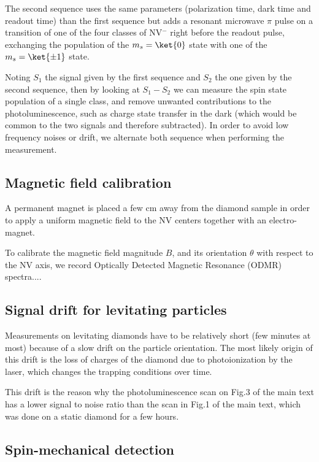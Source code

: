 \documentclass[preprintnumbers,amsmath,amssymb,onecolumn,12pt]{revtex4}
\begin{document}
The second sequence uses the same parameters (polarization time, dark time and readout time) than the first sequence but adds a resonant microwave $\pi$ pulse on a transition of one of the four classes of NV$^-$ right before the readout pulse, exchanging the population of the $m_s=\ket{0}$ state with one of the $m_s=\ket{\pm 1}$ state.

Noting $S_1$ the signal given by the first sequence and $S_2$ the one given by the second sequence, then by looking at $S_1-S_2$ we can measure the spin state population of a single class, and remove unwanted contributions to the photoluminescence, such as charge state transfer in the dark (which would be common to the two signals and therefore subtracted).
In order to avoid low frequency noises or drift, we alternate both sequence when performing the measurement.

\subsection{Magnetic field calibration}

A permanent magnet is placed a few cm away from the diamond sample in order to apply a uniform magnetic field to the NV centers together with an electro-magnet.

To calibrate the magnetic field magnitude $B$, and its orientation $\theta$ with respect to the NV axis, we record Optically Detected Magnetic Resonance (ODMR) spectra.... 

\subsection{Signal drift for levitating particles}

Measurements on levitating diamonds have to be relatively short (few minutes at most) because of a slow drift on the particle orientation. The most likely origin of this drift is the loss of charges of the diamond due to photoionization by the laser, which changes the trapping conditions over time.

This drift is the reason why the photoluminescence scan on Fig.3 of the main text has a lower signal to noise ratio than the scan in Fig.1 of the main text, which was done on a static diamond for a few hours.

\subsection{Spin-mechanical detection}
\end{document}
